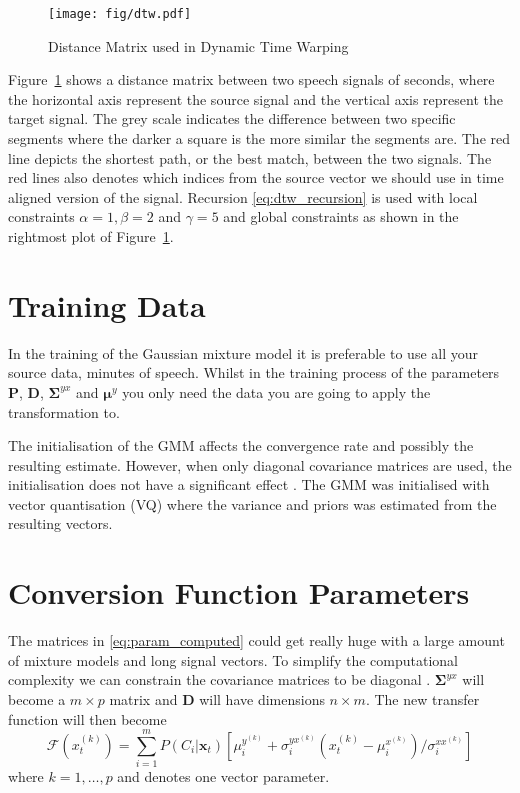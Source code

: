 \begin{figure}[htbp]
	\begin{center}
		\texttt{[image: fig/dtw.pdf]}
		\caption{Distance Matrix used in Dynamic Time Warping}
		\label{fig:dtw}
	\end{center}
\end{figure}
Figure~\ref{fig:dtw} shows a distance matrix between two speech signals of  seconds, where the horizontal axis represent the source signal and the vertical axis represent the target signal. The grey scale indicates the difference between two specific segments where the darker a square is the more similar the segments are. The red line depicts the shortest path, or the best match, between the two signals. The red lines also denotes which indices from the source vector we should use in time aligned version of the signal. Recursion \eqref{eq:dtw_recursion} is used with local constraints $\alpha=1, \beta=2$ and $\gamma=5$ and global constraints as shown in the rightmost plot of Figure~\ref{fig:dtw}.

\section{Training Data} %
\label{sec:training_data}
In the training of the Gaussian mixture model it is preferable to use all your source data,  minutes of speech. Whilst in the training process of the parameters $\mathbf{P}$, $\mathbf{D}$, $\mathbf{\Sigma}^{yx}$ and $\boldsymbol{\mu}^y$ you only need the data you are going to apply the transformation to.

The initialisation of the GMM affects the convergence rate and possibly the resulting estimate. However, when only diagonal covariance matrices are used, the initialisation does not have a significant effect \cite{reynolds93}. The GMM was initialised with vector quantisation (VQ) where the variance and priors was estimated from the resulting vectors.

\section{Conversion Function Parameters} %
\label{sec:conversion_function_parameters}
The matrices in \eqref{eq:param_computed} could get really huge with a large amount of mixture models and long signal vectors. To simplify the computational complexity we can constrain the covariance matrices to be diagonal \cite{stylianou98}. $\mathbf{\Sigma}^{yx}$ will become a $m\times p$ matrix and $\mathbf{D}$ will have dimensions $n\times m$. The new transfer function will then become
\begin{equation}
	\mathcal{F}(x_t^{(k)}) = \sum_{i=1}^{m}P(C_i \vert \mathbf{x}_t)[\mu_i^{y^{(k)}}+\sigma_i^{yx^{(k)}}  (x_t^{(k)}-\mu_i^{x^{(k)}})/\sigma_i^{xx^{(k)}}]
\end{equation}
where $k=1,\dots,p$ and denotes one vector parameter.

